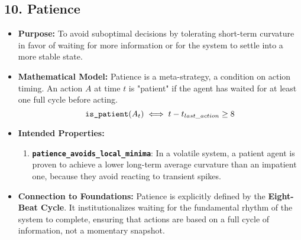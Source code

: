 \documentclass[11pt,a4paper]{article}
\begin{document}
\begin{itemize}
\subsection{10. Patience}
\begin{itemize}
    \item \textbf{Purpose:} To avoid suboptimal decisions by tolerating short-term curvature in favor of waiting for more information or for the system to settle into a more stable state.
    \item \textbf{Mathematical Model:} Patience is a meta-strategy, a condition on action timing. An action $A$ at time $t$ is "patient" if the agent has waited for at least one full cycle before acting.
        \[ \text{\texttt{is\_patient}}(A_t) \iff t - t_{last\_action} \ge 8 \]
    \item \textbf{Intended Properties:}
        \begin{enumerate}
            \item \textbf{\texttt{patience\_avoids\_local\_minima}}: In a volatile system, a patient agent is proven to achieve a lower long-term average curvature than an impatient one, because they avoid reacting to transient spikes.
        \end{enumerate}
    \item \textbf{Connection to Foundations:} Patience is explicitly defined by the \textbf{Eight-Beat Cycle}. It institutionalizes waiting for the fundamental rhythm of the system to complete, ensuring that actions are based on a full cycle of information, not a momentary snapshot.
\end{itemize}


\end{itemize}
\end{document}
